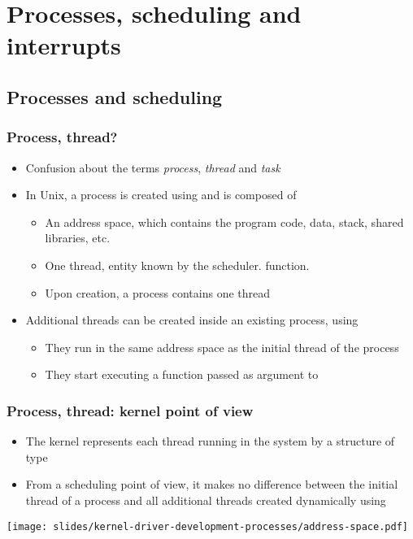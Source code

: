 \section{Processes, scheduling and interrupts}

\subsection{Processes and scheduling}

\begin{frame}
  \frametitle{Process, thread?}
  \begin{itemize}
  \item Confusion about the terms \emph{process}, \emph{thread} and
    \emph{task}
  \item In Unix, a process is created using  and is
    composed of
    \begin{itemize}
    \item An address space, which contains the program code, data,
      stack, shared libraries, etc.
    \item One thread, entity known by the scheduler.
      function.
    \item Upon creation, a process contains one thread
    \end{itemize}
  \item Additional threads can be created inside an existing process,
    using 
    \begin{itemize}
    \item They run in the same address space as the initial thread of
      the process
    \item They start executing a function passed as argument to
    \end{itemize}
  \end{itemize}
\end{frame}

\begin{frame}
  \frametitle{Process, thread: kernel point of view}
  \begin{itemize}
  \item The kernel represents each thread running in the system by a
    structure of type 
  \item From a scheduling point of view, it makes no difference
    between the initial thread of a process and all additional threads
    created dynamically using 
  \end{itemize}
  \begin{center}
    \texttt{[image: slides/kernel-driver-development-processes/address-space.pdf]}
  \end{center}
\end{frame}

